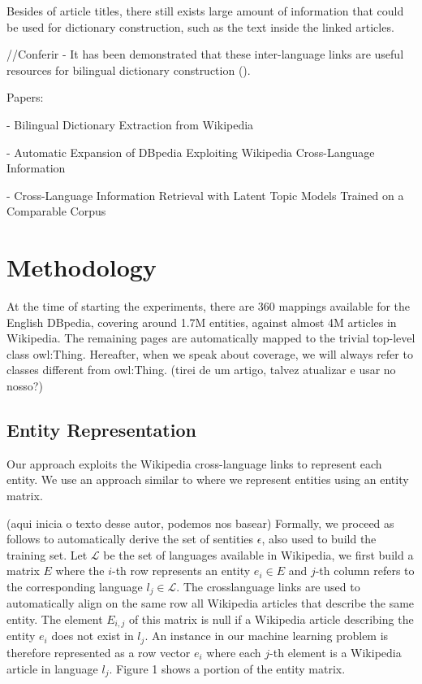 \documentclass[10pt,a4paper]{llncs}
\begin{document}
Besides of article titles, there still exists large amount of information that could be used for dictionary construction, such as the text inside the linked articles.

//Conferir - It has been demonstrated that these inter-language links are useful resources for bilingual dictionary construction (\cite{erdmann}).

Papers:

- Bilingual Dictionary Extraction from Wikipedia

- Automatic Expansion of DBpedia Exploiting Wikipedia Cross-Language Information

- Cross-Language Information Retrieval with Latent Topic Models Trained on a Comparable Corpus

\section{Methodology}

At the time of starting the experiments, there are 360 mappings available for the English DBpedia, covering around 1.7M entities,
against almost 4M articles in Wikipedia. The remaining pages are automatically mapped to the trivial top-level class owl:Thing. Hereafter, when we speak about coverage, we will always refer to classes different from owl:Thing. (tirei de um artigo, talvez atualizar e usar no nosso?)

\subsection{Entity Representation}

Our approach exploits the Wikipedia cross-language links to represent each entity. We use an approach similar to \cite{aprosio} where we represent entities using an entity matrix. 

(aqui inicia o texto desse autor, podemos nos basear)
Formally, we proceed as follows to automatically derive the set of sentities $\epsilon$, also used to build the training set. Let $\mathcal{L}$ be the set of languages available in Wikipedia, we first build a matrix $E$ where the $i$-th row represents an entity $e_i \in E$ and $j$-th column refers to the corresponding language $l_j \in \mathcal{L}$. The crosslanguage links are used to automatically align on the same row all Wikipedia articles that describe the same entity. The element $E_{i,j}$ of this matrix is null if a Wikipedia article describing the entity $e_i$ does not exist in $l_j$. An instance in our machine learning problem is therefore represented as a row vector $e_i$ where each $j$-th element is a Wikipedia article in language $l_j$. Figure 1 shows a portion of the entity matrix.
\end{document}
